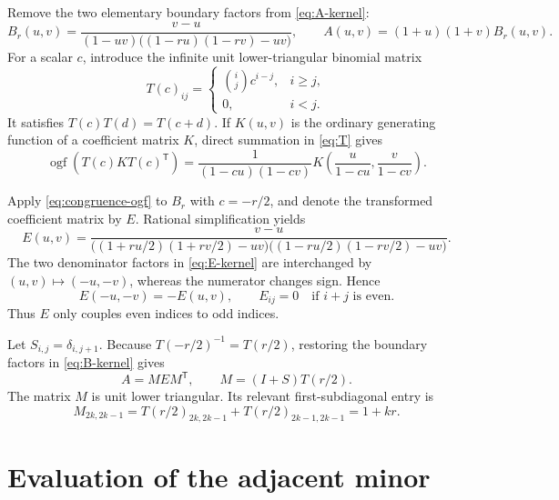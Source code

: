 \documentclass[11pt]{article}
\newcommand{\ogf}{\operatorname{ogf}}
\begin{document}
Remove the two elementary boundary factors from \eqref{eq:A-kernel}:
\begin{equation}
 B_r(u,v)=
 \frac{v-u}{(1-uv)\bigl((1-ru)(1-rv)-uv\bigr)},\qquad
 A(u,v)=(1+u)(1+v)B_r(u,v).
 \label{eq:B-kernel}
\end{equation}
For a scalar \(c\), introduce the infinite unit lower-triangular binomial
matrix
\begin{equation}
 T(c)_{ij}=
 \begin{cases}
 \binom{i}{j}c^{i-j},&i\geq j,\\
 0,&i<j.
 \end{cases}
 \label{eq:T}
\end{equation}
It satisfies \(T(c)T(d)=T(c+d)\).  If \(K(u,v)\) is the ordinary
generating function of a coefficient matrix \(K\), direct summation in
\eqref{eq:T} gives
\begin{equation}
 \ogf\!\left(T(c)KT(c)^{\mathsf T}\right)
 =\frac{1}{(1-cu)(1-cv)}
 K\!\left(\frac{u}{1-cu},\frac{v}{1-cv}\right).
 \label{eq:congruence-ogf}
\end{equation}

Apply \eqref{eq:congruence-ogf} to \(B_r\) with \(c=-r/2\), and denote
the transformed coefficient matrix by \(E\).  Rational simplification
yields
\begin{equation}
 E(u,v)=
 \frac{v-u}{
 \bigl((1+ru/2)(1+rv/2)-uv\bigr)
 \bigl((1-ru/2)(1-rv/2)-uv\bigr)}.
 \label{eq:E-kernel}
\end{equation}
The two denominator factors in \eqref{eq:E-kernel} are interchanged by
\((u,v)\mapsto(-u,-v)\), whereas the numerator changes sign.  Hence
\begin{equation}
 E(-u,-v)=-E(u,v),\qquad
 E_{ij}=0\quad\text{if }i+j\text{ is even}.
 \label{eq:parity}
\end{equation}
Thus \(E\) only couples even indices to odd indices.

Let \(S_{i,j}=\delta_{i,j+1}\).  Because \(T(-r/2)^{-1}=T(r/2)\),
restoring the boundary factors in \eqref{eq:B-kernel} gives
\begin{equation}
 A=MEM^{\mathsf T},\qquad
 M=(I+S)T(r/2).
 \label{eq:A-MEM}
\end{equation}
The matrix \(M\) is unit lower triangular.  Its relevant
first-subdiagonal entry is
\begin{equation}
 M_{2k,2k-1}
 =T(r/2)_{2k,2k-1}+T(r/2)_{2k-1,2k-1}
 =1+kr.
 \label{eq:M-subdiag}
\end{equation}

\section{Evaluation of the adjacent minor}
\end{document}
